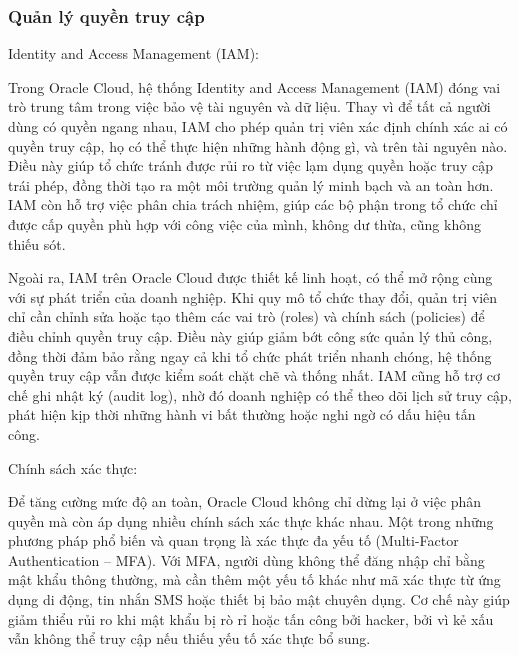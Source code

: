\subsubsection{Quản lý quyền truy cập}
\begin{myitem}
    \item Identity and Access Management (IAM):
    \begin{mysubitem}
        \item Trong Oracle Cloud, hệ thống Identity and Access Management (IAM) đóng vai trò trung tâm trong việc bảo vệ tài nguyên và dữ liệu. Thay vì để tất cả người dùng có quyền ngang nhau, IAM cho phép quản trị viên xác định chính xác ai có quyền truy cập, họ có thể thực hiện những hành động gì, và trên tài nguyên nào. Điều này giúp tổ chức tránh được rủi ro từ việc lạm dụng quyền hoặc truy cập trái phép, đồng thời tạo ra một môi trường quản lý minh bạch và an toàn hơn. IAM còn hỗ trợ việc phân chia trách nhiệm, giúp các bộ phận trong tổ chức chỉ được cấp quyền phù hợp với công việc của mình, không dư thừa, cũng không thiếu sót.

        \item Ngoài ra, IAM trên Oracle Cloud được thiết kế linh hoạt, có thể mở rộng cùng với sự phát triển của doanh nghiệp. Khi quy mô tổ chức thay đổi, quản trị viên chỉ cần chỉnh sửa hoặc tạo thêm các vai trò (roles) và chính sách (policies) để điều chỉnh quyền truy cập. Điều này giúp giảm bớt công sức quản lý thủ công, đồng thời đảm bảo rằng ngay cả khi tổ chức phát triển nhanh chóng, hệ thống quyền truy cập vẫn được kiểm soát chặt chẽ và thống nhất. IAM cũng hỗ trợ cơ chế ghi nhật ký (audit log), nhờ đó doanh nghiệp có thể theo dõi lịch sử truy cập, phát hiện kịp thời những hành vi bất thường hoặc nghi ngờ có dấu hiệu tấn công.
    \end{mysubitem}

    \item Chính sách xác thực:
    \begin{mysubitem}
        \item Để tăng cường mức độ an toàn, Oracle Cloud không chỉ dừng lại ở việc phân quyền mà còn áp dụng nhiều chính sách xác thực khác nhau. Một trong những phương pháp phổ biến và quan trọng là xác thực đa yếu tố (Multi-Factor Authentication – MFA). Với MFA, người dùng không thể đăng nhập chỉ bằng mật khẩu thông thường, mà cần thêm một yếu tố khác như mã xác thực từ ứng dụng di động, tin nhắn SMS hoặc thiết bị bảo mật chuyên dụng. Cơ chế này giúp giảm thiểu rủi ro khi mật khẩu bị rò rỉ hoặc tấn công bởi hacker, bởi vì kẻ xấu vẫn không thể truy cập nếu thiếu yếu tố xác thực bổ sung.


\end{mysubitem}
\end{myitem}

